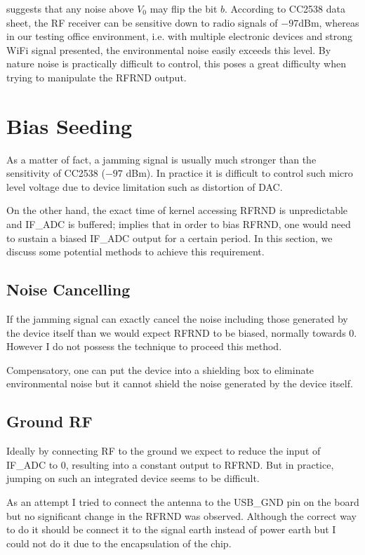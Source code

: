  suggests that any noise above $V_0$ may flip the bit $b$. According to CC2538 data sheet\cite{CC2538_Datasheet}, the RF receiver can be sensitive down to radio signals of $-97$dBm, whereas in our testing office environment, i.e. with multiple electronic devices and strong WiFi signal presented, the environmental noise easily exceeds this level. By nature noise is practically difficult to control, this poses a great difficulty when trying to manipulate the RFRND output.

\section{Bias Seeding}

As a matter of fact, a jamming signal is usually much stronger than the sensitivity of CC2538 ($-97$ dBm). In practice it is difficult to control such micro level voltage due to device limitation such as distortion of DAC.

On the other hand, the exact time of kernel accessing RFRND is unpredictable and IF\_ADC is buffered; implies that in order to bias RFRND, one would need to sustain a biased IF\_ADC output for a certain period. In this section, we discuss some potential methods to achieve this requirement.

\subsection{Noise Cancelling}

If the jamming signal can exactly cancel the noise including those generated by the device itself than we would expect RFRND to be biased, normally towards $0$. However I do not possess the technique to proceed this method.

Compensatory, one can put the device into a shielding box to eliminate environmental noise but it cannot shield the noise generated by the device itself.

\subsection{Ground RF}

Ideally by connecting RF to the ground we expect to reduce the input of IF\_ADC to $0$, resulting into a constant output to RFRND. But in practice, jumping on such an integrated device seems to be difficult.

As an attempt I tried to connect the antenna to the USB\_GND pin on the board but no significant change in the RFRND was observed. Although the correct way to do it should be connect it to the signal earth instead of power earth but I could not do it due to the encapsulation of the chip.

